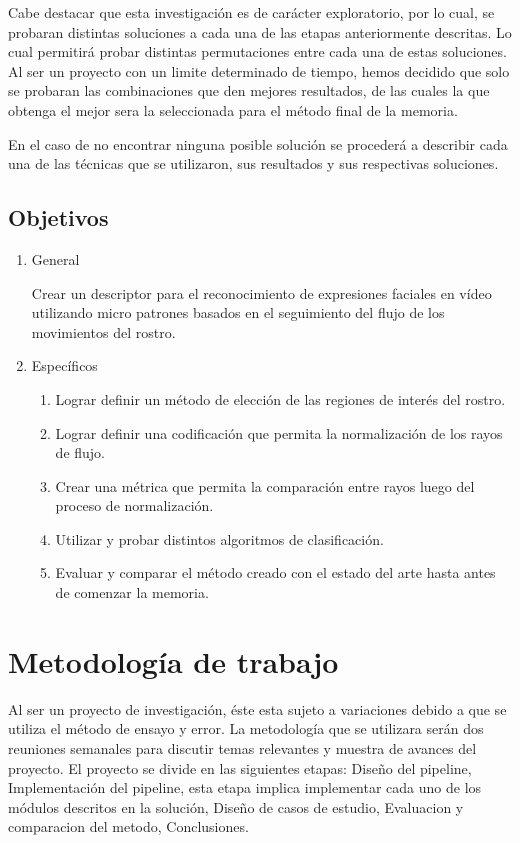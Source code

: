 \documentclass{article}
\begin{document}
Cabe destacar que esta investigación es de carácter exploratorio, por lo cual, se probaran distintas soluciones a cada una de las etapas anteriormente descritas. Lo cual permitirá probar distintas permutaciones entre cada una de estas soluciones. Al ser un proyecto con un limite determinado de tiempo, hemos decidido que solo se probaran las combinaciones que den mejores resultados, de las cuales la que obtenga el mejor sera la seleccionada para el método final de la memoria. 

En el caso de no encontrar ninguna posible solución se procederá a describir cada una de las técnicas que se utilizaron, sus resultados y sus respectivas soluciones.  

\subsection{Objetivos} 
\begin{enumerate}
\item General

Crear un descriptor para el reconocimiento de expresiones faciales en vídeo utilizando micro patrones basados en el seguimiento del flujo de los movimientos del rostro.

\item Específicos
    \begin{enumerate}
    \item Lograr definir un método de elección de las regiones de interés del rostro.
    \item Lograr definir una codificación que permita la normalización de los rayos de flujo.
    \item Crear una métrica que permita la comparación entre rayos luego del proceso de normalización.
    \item Utilizar y probar distintos algoritmos de clasificación.
    \item Evaluar y comparar el método creado con el estado del arte hasta antes de comenzar la memoria.
    \end{enumerate}
\end{enumerate}

\section{Metodología de trabajo}
Al ser un proyecto de investigación, éste esta sujeto a variaciones debido a que se utiliza el método de ensayo y error. La metodología que se utilizara serán dos reuniones semanales para discutir temas relevantes y muestra de avances del proyecto.
	El proyecto se divide en las siguientes etapas: Diseño del pipeline, Implementación del pipeline, esta etapa implica implementar cada uno de los módulos descritos en la solución, Diseño de casos de estudio, Evaluacion y comparacion del metodo, Conclusiones.
\end{document}
